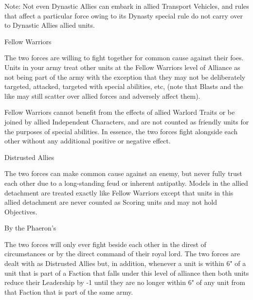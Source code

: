 Note: Not even Dynastic Allies can embark in allied Transport Vehicles, and rules that affect a particular force owing to its Dynasty special rule do not carry over to Dynastic Allies allied units.

\noindent
\blackskull Fellow Warriors

The two forces are willing to fight together for common cause against their foes. Units in your army treat other units at the Fellow Warriors level of Alliance as not being part of the army with the exception that they may not be deliberately targeted, attacked, targeted with special abilities, etc, (note that Blasts and the like may still scatter over allied forces and adversely affect them).

Fellow Warriors cannot benefit from the effects of allied Warlord Traits or be joined by allied Independent Characters, and are not counted as friendly units for the purposes of special abilities. In essence, the two forces fight alongside each other without any additional positive or negative effect.

\noindent
\greyskull Distrusted Allies

The two forces can make common cause against an enemy, but never fully trust each other due to a long-standing feud or inherent antipathy. Models in the allied detachment are treated exactly like Fellow Warriors except that units in this allied detachment are never counted as Scoring units and may not hold Objectives.

\noindent
\redskull By the Phaeron's

The two forces will only ever fight beside each other in the direst of circumstances or by the direct command of their royal lord. The two forces are dealt with as Distrusted Allies but, in addition, whenever a unit is within 6" of a unit that is part of a Faction that falls under this level of alliance then both units reduce their Leadership by -1 until they are no longer within 6" of any unit from that Faction that is part of the same army.

\subsection[Units]{}

\newpage
\subsubsection[Destroyer Lord]{}

